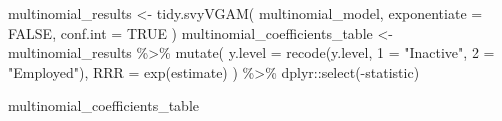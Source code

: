 \documentclass[
  spanish,
  11pt,
  letterpaper,
  oneside,
  open=any]{scrbook}
\newenvironment{Shaded}{\begin{snugshade}}{\end{snugshade}}
\newcommand{\AttributeTok}[1]{\textcolor[rgb]{0.40,0.45,0.13}{#1}}
\newcommand{\ConstantTok}[1]{\textcolor[rgb]{0.56,0.35,0.01}{#1}}
\newcommand{\FunctionTok}[1]{\textcolor[rgb]{0.28,0.35,0.67}{#1}}
\newcommand{\NormalTok}[1]{\textcolor[rgb]{0.00,0.23,0.31}{#1}}
\newcommand{\OtherTok}[1]{\textcolor[rgb]{0.00,0.23,0.31}{#1}}
\newcommand{\SpecialCharTok}[1]{\textcolor[rgb]{0.37,0.37,0.37}{#1}}
\newcommand{\StringTok}[1]{\textcolor[rgb]{0.13,0.47,0.30}{#1}}
\begin{document}
\begin{Shaded}
\begin{Highlighting}[]
\NormalTok{multinomial\_results }\OtherTok{\textless{}{-}} \FunctionTok{tidy.svyVGAM}\NormalTok{(}
\NormalTok{  multinomial\_model,}
  \AttributeTok{exponentiate =} \ConstantTok{FALSE}\NormalTok{,}
  \AttributeTok{conf.int =} \ConstantTok{TRUE}
\NormalTok{)}
\NormalTok{multinomial\_coefficients\_table }\OtherTok{\textless{}{-}}\NormalTok{ multinomial\_results }\SpecialCharTok{\%\textgreater{}\%}
  \FunctionTok{mutate}\NormalTok{(}
    \AttributeTok{y.level =} \FunctionTok{recode}\NormalTok{(y.level, }\StringTok{\textasciigrave{}}\AttributeTok{1}\StringTok{\textasciigrave{}} \OtherTok{=} \StringTok{"Inactive"}\NormalTok{, }\StringTok{\textasciigrave{}}\AttributeTok{2}\StringTok{\textasciigrave{}} \OtherTok{=} \StringTok{"Employed"}\NormalTok{),}
    \AttributeTok{RRR =} \FunctionTok{exp}\NormalTok{(estimate)}
\NormalTok{  ) }\SpecialCharTok{\%\textgreater{}\%}
\NormalTok{  dplyr}\SpecialCharTok{::}\FunctionTok{select}\NormalTok{(}\SpecialCharTok{{-}}\NormalTok{statistic)}

\NormalTok{multinomial\_coefficients\_table}
\end{Highlighting}
\end{Shaded}
\end{document}
